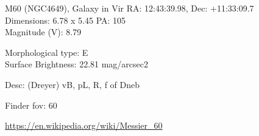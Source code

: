 \begin{block}{M60 (NGC4649), Galaxy in Vir}
    RA: 12:43:39.98, Dec: +11:33:09.7 \\ 
    Dimensions: 6.78 x 5.45 PA: 105 \\ 
    Magnitude (V): 8.79

    Morphological type: E \\ 
    Surface Brightness: 22.81 mag/arcsec2 

    Desc: (Dreyer) vB, pL, R, f of Dneb 

    Finder fov: 60 

    \url{https://en.wikipedia.org/wiki/Messier_60} 
\end{block}